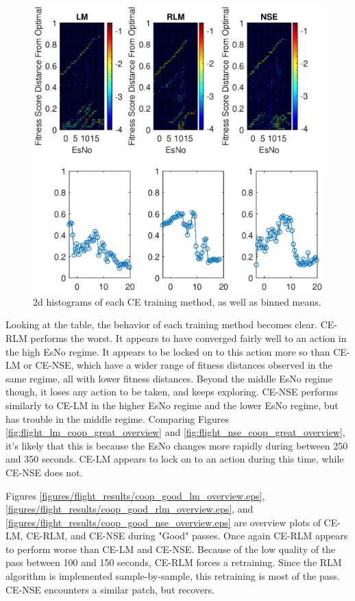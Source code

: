 \begin{figure}[ht]
\centering
\includegraphics[width=\textwidth]{figures/flight_results/coop_great_2dhist.eps}
\caption{2d histograms of each CE training method, as well as binned means.}
\label{fig:coop_great_2dhist}
\end{figure}
\par Looking at the table, the behavior of each training method becomes clear. CE-RLM performs the worst. It appears to have converged fairly well to an action in the high EsNo regime. It appears to be locked on to this action more so than CE-LM or CE-NSE, which have a wider range of fitness distances observed in the same regime, all with lower fitness distances. Beyond the middle EsNo regime though, it loses any action to be taken, and keeps exploring. CE-NSE performs similarly to CE-LM in the higher EsNo regime and the lower EsNo regime, but has trouble in the middle regime. Comparing Figures \ref{fig:flight_lm_coop_great_overview} and \ref{fig:flight_nse_coop_great_overview}, it's likely that this is because the EsNo changes more rapidly during between 250 and 350 seconds. CE-LM appears to lock on to an action during this time, while CE-NSE does not. 


\par Figures \ref{figures/flight_results/coop_good_lm_overview.eps}, \ref{figures/flight_results/coop_good_rlm_overview.eps}, and \ref{figures/flight_results/coop_good_nse_overview.eps} are overview plots of CE-LM, CE-RLM, and CE-NSE during "Good" passes. Once again CE-RLM appears to perform worse than CE-LM and CE-NSE. Because of the low quality of the pass between 100 and 150 seconds, CE-RLM forces a retraining. Since the RLM algorithm is implemented sample-by-sample, this retraining is most of the pass. CE-NSE encounters a similar patch, but recovers. 

